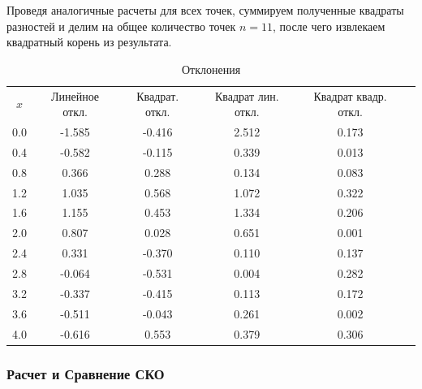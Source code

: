 \documentclass{article}
\begin{document}
            Проведя аналогичные расчеты для всех точек, суммируем полученные квадраты разностей и делим на общее количество точек \(n = 11\), после чего извлекаем квадратный корень из результата.
            \begin{table}[htbp]
                  \centering
                  \label{tab:my-table}
                  \begin{tabular}{@{}cccccc@{}}
                        \(x\) & Линейное откл. & Квадрат. откл. & Квадрат лин. откл. & Квадрат квадр. откл. \\ 
                        0.0   & -1.585         & -0.416          & 2.512               & 0.173                 \\
                        0.4   & -0.582         & -0.115          & 0.339               & 0.013                 \\
                        0.8   & 0.366          & 0.288           & 0.134               & 0.083                 \\
                        1.2   & 1.035          & 0.568           & 1.072               & 0.322                 \\
                        1.6   & 1.155          & 0.453           & 1.334               & 0.206                 \\
                        2.0   & 0.807          & 0.028           & 0.651               & 0.001                 \\
                        2.4   & 0.331          & -0.370          & 0.110               & 0.137                 \\
                        2.8   & -0.064         & -0.531          & 0.004               & 0.282                 \\
                        3.2   & -0.337         & -0.415          & 0.113               & 0.172                 \\
                        3.6   & -0.511         & -0.043          & 0.261               & 0.002                 \\
                        4.0   & -0.616         & 0.553           & 0.379               & 0.306                 \\
                  \end{tabular}
                  \caption{Отклонения}
              \end{table}

      
      \subsubsection{Расчет и Сравнение СКО}
\end{document}
